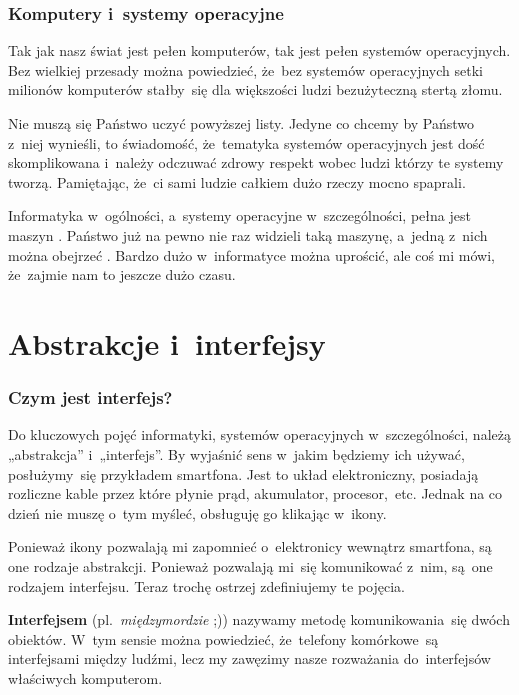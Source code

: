 \documentclass[10pt,t]{beamer}
\begin{document}
\begin{frame}
  \frametitle{Komputery i~systemy operacyjne}


  Tak jak nasz świat jest pełen komputerów, tak jest pełen systemów
  operacyjnych. Bez wielkiej przesady można powiedzieć, że~bez systemów
  operacyjnych setki milionów komputerów stałby~się dla większości ludzi
  bezużyteczną stertą złomu.

  \alert{Nie} muszą się Państwo uczyć powyższej listy. Jedyne co chcemy by
  Państwo z~niej wynieśli, to świadomość, że~tematyka systemów operacyjnych
  jest dość skomplikowana i~należy odczuwać zdrowy respekt wobec
  ludzi którzy te systemy tworzą. Pamiętając, że~ci sami ludzie
  całkiem dużo rzeczy mocno spaprali.

  Informatyka w~ogólności, a~systemy operacyjne w~szczególności, pełna jest
  maszyn
  . Państwo już na pewno nie raz
  widzieli taką maszynę, a~jedną z~nich można obejrzeć
  .
  Bardzo dużo w~informatyce można uprościć, ale coś mi mówi, że~zajmie nam
  to jeszcze dużo czasu.

\end{frame}










\section{Abstrakcje i~interfejsy}


\begin{frame}
  \frametitle{Czym jest interfejs?}


  Do kluczowych pojęć informatyki, systemów operacyjnych w~szczególności,
  należą „abstrakcja” i~„interfejs”. By wyjaśnić sens w~jakim będziemy ich
  używać, posłużymy~się przykładem smartfona. Jest to układ elektroniczny,
  posiadają rozliczne kable przez które płynie prąd, akumulator,
  procesor,~etc. Jednak na co dzień nie muszę o~tym myśleć, obsługuję go
  klikając w~ikony.

  Ponieważ ikony pozwalają mi zapomnieć o~elektronicy wewnątrz smartfona,
  są one rodzaje abstrakcji. Ponieważ pozwalają mi~się komunikować z~nim,
  są~one rodzajem interfejsu. Teraz trochę ostrzej zdefiniujemy te pojęcia.

  \textbf{Interfejsem} (pl.~\textit{międzymordzie} ;)) nazywamy metodę
  komunikowania~się dwóch obiektów. W~tym sensie można powiedzieć,
  że~telefony komórkowe~są interfejsami między ludźmi, lecz my zawęzimy
  nasze rozważania do~interfejsów właściwych komputerom.

\end{frame}
\end{document}
